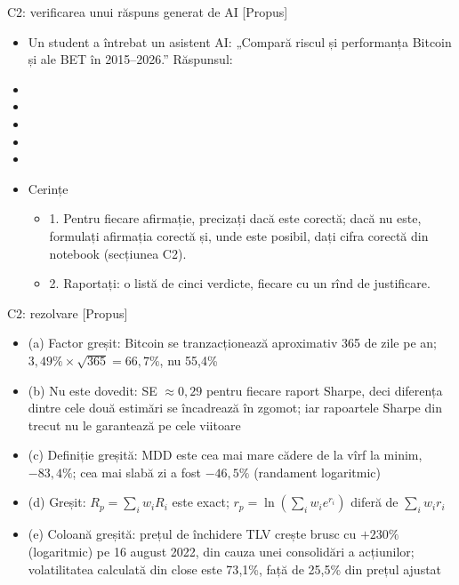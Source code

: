 \begin{frame}{C2: verificarea unui răspuns generat de AI [Propus]}
\itemsize{\scriptsize}
\begin{itemize}
    \item Un student a întrebat un asistent AI: „Compară riscul și performanța Bitcoin și ale BET în 2015--2026.” Răspunsul:
    \item {}
    \item {}
    \item {}
    \item {}
    \item {}
    \item Cerințe
    \begin{itemize}
        \item 1. Pentru fiecare afirmație, precizați dacă este corectă; dacă nu este, formulați afirmația corectă și, unde este posibil, dați cifra corectă din notebook (secțiunea C2).
        \item 2. Raportați: o listă de cinci verdicte, fiecare cu un rînd de justificare.
    \end{itemize}
\end{itemize}
\end{frame}

\ifsolutions
\begin{frame}{C2: rezolvare [Propus]}
\itemsize{\footnotesize}
\begin{itemize}
    \item (a) Factor greșit: Bitcoin se tranzacționează aproximativ 365 de zile pe an; $3{,}49\% \times \sqrt{365} = 66{,}7\%$, nu 55{,}4\%
    \item (b) Nu este dovedit: SE $\approx 0{,}29$ pentru fiecare raport Sharpe, deci diferența dintre cele două estimări se încadrează în zgomot; iar rapoartele Sharpe din trecut nu le garantează pe cele viitoare
    \item (c) Definiție greșită: MDD este cea mai mare cădere de la vîrf la minim, $-83{,}4\%$; cea mai slabă zi a fost $-46{,}5\%$ (randament logaritmic)
    \item (d) Greșit: $R_p = \sum_i w_i R_i$ este exact; $r_p = \ln(\sum_i w_i e^{r_i})$ diferă de $\sum_i w_i r_i$
    \item (e) Coloană greșită: prețul de închidere TLV crește brusc cu $+230\%$ (logaritmic) pe 16 august 2022, din cauza unei consolidări a acțiunilor; volatilitatea calculată din close este 73{,}1\%, față de 25{,}5\% din prețul ajustat
\end{itemize}
\end{frame}
\fi


